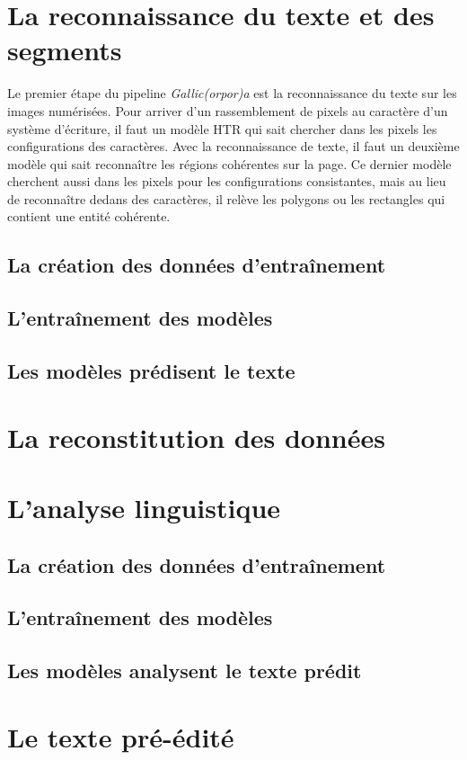 \documentclass[class=article, crop=false]{standalone}
\begin{document}
\section{La reconnaissance du texte et des segments}

Le premier étape du pipeline \textit{Gallic(orpor)a} est la reconnaissance du texte sur les images numérisées. Pour arriver d'un rassemblement de pixels au caractère d'un système d'écriture, il faut un modèle HTR qui sait chercher dans les pixels les configurations des caractères. Avec la reconnaissance de texte, il faut un deuxième modèle qui sait reconnaître les régions cohérentes sur la page. Ce dernier modèle cherchent aussi dans les pixels pour les configurations consistantes, mais au lieu de reconnaître dedans des caractères, il relève les polygons ou les rectangles qui contient une entité cohérente.

\subsection{La création des données d'entraînement}

\subsection{L'entraînement des modèles}

\subsection{Les modèles prédisent le texte}

\section{La reconstitution des données}

\section{L'analyse linguistique}

\subsection{La création des données d'entraînement}

\subsection{L'entraînement des modèles}

\subsection{Les modèles analysent le texte prédit}

\section{Le texte pré-édité}
\end{document}
